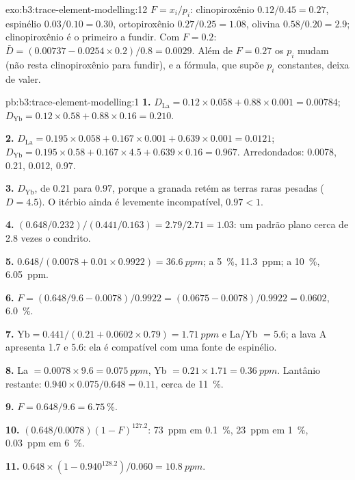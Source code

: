 \begin{solution}{exo:b3:trace-element-modelling:12}
$F = x_i/p_i$: clinopiroxênio $0.12/0.45 = 0.27$, espinélio $0.03/0.10 = 0.30$,
ortopiroxênio $0.27/0.25 = 1.08$, olivina $0.58/0.20 = 2.9$; clinopiroxênio
é o primeiro a fundir. Com $F = 0.2$: $\bar D = (0.00737 - 0.0254\times0.2)/0.8 =
0.0029$. Além de $F = 0.27$ os $p_i$ mudam (não resta clinopiroxênio para fundir),
e a fórmula, que supõe $p_i$ constantes, deixa de valer.
\end{solution}

\begin{solution}{pb:b3:trace-element-modelling:1}
\textbf{1.} $D_{\mathrm{La}} = 0.12\times0.058 + 0.88\times0.001 = 0.00784$;
$D_{\mathrm{Yb}} = 0.12\times0.58 + 0.88\times0.16 = 0.210$.

\textbf{2.} $D_{\mathrm{La}} = 0.195\times0.058 + 0.167\times0.001 +
0.639\times0.001 = 0.0121$; $D_{\mathrm{Yb}} = 0.195\times0.58 +
0.167\times4.5 + 0.639\times0.16 = 0.967$. Arredondados: 0.0078, 0.21, 0.012, 0.97.

\textbf{3.} $D_{\mathrm{Yb}}$, de 0.21 para 0.97, porque a granada retém as
terras raras pesadas ($D = 4.5$). O itérbio ainda é levemente incompatível,
$0.97 < 1$.

\textbf{4.} $(0.648/0.232)/(0.441/0.163) = 2.79/2.71 = 1.03$: um padrão plano
cerca de 2.8 vezes o condrito.

\textbf{5.} $0.648/(0.0078 + 0.01\times0.9922) = \qty{36.6}{ppm}$; a
\qty{5}{\percent}, \qty{11.3}{ppm}; a \qty{10}{\percent}, \qty{6.05}{ppm}.

\textbf{6.} $F = (0.648/9.6 - 0.0078)/0.9922 = (0.0675 - 0.0078)/0.9922 =
0.0602$, \qty{6.0}{\percent}.

\textbf{7.} $\mathrm{Yb} = 0.441/(0.21 + 0.0602\times0.79) = \qty{1.71}{ppm}$
e La/Yb $= 5.6$; a lava A apresenta 1.7 e 5.6: ela é compatível com uma fonte de espinélio.

\textbf{8.} La $= 0.0078\times9.6 = \qty{0.075}{ppm}$, Yb $= 0.21\times1.71 =
\qty{0.36}{ppm}$. Lantânio restante: $0.940\times0.075/0.648 = 0.11$, cerca de
\qty{11}{\percent}.

\textbf{9.} $F = 0.648/9.6 = \qty{6.75}{\percent}$.

\textbf{10.} $(0.648/0.0078)(1 - F)^{127.2}$: \qty{73}{ppm} em
\qty{0.1}{\percent}, \qty{23}{ppm} em \qty{1}{\percent}, \qty{0.03}{ppm} em
\qty{6}{\percent}.

\textbf{11.} $0.648\times(1 - 0.940^{128.2})/0.060 = \qty{10.8}{ppm}$.


\end{solution}
